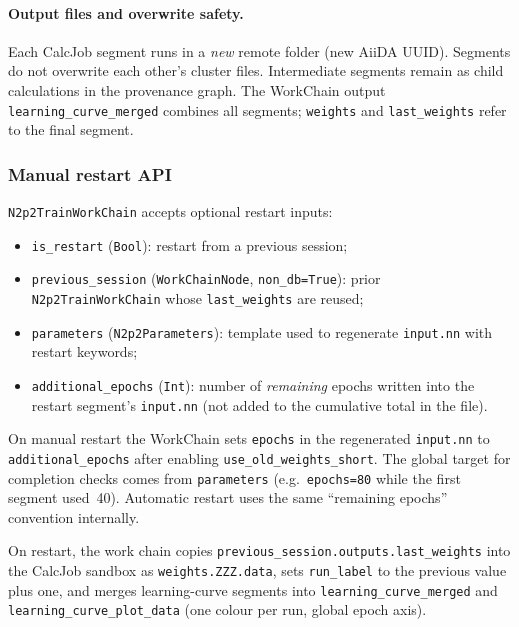 \paragraph{Output files and overwrite safety.}
Each CalcJob segment runs in a \emph{new} remote folder (new AiiDA UUID).
Segments do not overwrite each other's cluster files.
Intermediate segments remain as child calculations in the provenance graph.
The WorkChain output \texttt{learning\_curve\_merged} combines all segments;
\texttt{weights} and \texttt{last\_weights} refer to the final segment.

\subsubsection{Manual restart API}
\label{subsubsec:manual-restart}

\texttt{N2p2TrainWorkChain} accepts optional restart inputs:

\begin{itemize}
  \item \texttt{is\_restart} (\texttt{Bool}): restart from a previous session;
  \item \texttt{previous\_session} (\texttt{WorkChainNode}, \texttt{non\_db=True}):
        prior \texttt{N2p2TrainWorkChain} whose \texttt{last\_weights} are reused;
  \item \texttt{parameters} (\texttt{N2p2Parameters}): template used to regenerate
        \texttt{input.nn} with restart keywords;
  \item \texttt{additional\_epochs} (\texttt{Int}): number of \emph{remaining}
        epochs written into the restart segment's \texttt{input.nn} (not added to
        the cumulative total in the file).
\end{itemize}

On manual restart the WorkChain sets \texttt{epochs} in the regenerated
\texttt{input.nn} to \texttt{additional\_epochs} after enabling
\texttt{use\_old\_weights\_short}.
The global target for completion checks comes from \texttt{parameters} (e.g.\
\texttt{epochs=80} while the first segment used~40).
Automatic restart uses the same ``remaining epochs'' convention internally.

On restart, the work chain copies \texttt{previous\_session.outputs.last\_weights}
into the CalcJob sandbox as \texttt{weights.ZZZ.data}, sets \texttt{run\_label} to
the previous value plus one, and merges learning-curve segments into
\texttt{learning\_curve\_merged} and \texttt{learning\_curve\_plot\_data}
(one colour per run, global epoch axis).

